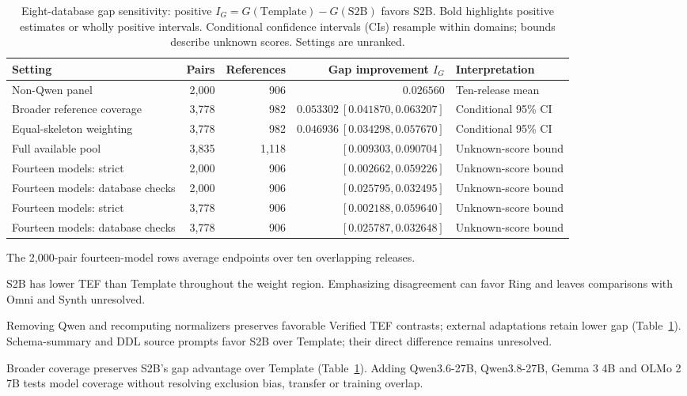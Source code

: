 \begin{table}[t]\centering\small
\caption{Eight-database gap sensitivity: positive $I_G=G(\mathrm{Template})-G(\mathrm{S2B})$ favors S2B. Bold highlights positive estimates or wholly positive intervals. Conditional confidence intervals (CIs) resample within domains; bounds describe unknown scores. Settings are unranked.}
\label{tab:panel-coverage}
\begin{tabular}{lrrrl}\toprule
Setting & Pairs & References & Gap improvement $I_G$ & Interpretation\\\midrule
Non-Qwen panel &2,000&906&$\boldsymbol{0.026560}$&Ten-release mean\\
Broader reference coverage &3,778&982&$\boldsymbol{0.053302\ [0.041870,0.063207]}$&Conditional 95\% CI\\
Equal-skeleton weighting &3,778&982&$\boldsymbol{0.046936\ [0.034298,0.057670]}$&Conditional 95\% CI\\
Full available pool &3,835&1,118&$\boldsymbol{[0.009303,0.090704]}$&Unknown-score bound\\\midrule
Fourteen models: strict &2,000&906&$\boldsymbol{[0.002662,0.059226]}$&Unknown-score bound\\
Fourteen models: database checks &2,000&906&$\boldsymbol{[0.025795,0.032495]}$&Unknown-score bound\\
Fourteen models: strict &3,778&906&$\boldsymbol{[0.002188,0.059640]}$&Unknown-score bound\\
Fourteen models: database checks &3,778&906&$\boldsymbol{[0.025787,0.032648]}$&Unknown-score bound\\\bottomrule
\end{tabular}

\smallskip\parbox{\textwidth}{\footnotesize The 2,000-pair fourteen-model rows average endpoints over ten overlapping releases.}
\end{table}

S2B has lower TEF than Template throughout the weight region. Emphasizing disagreement can favor Ring and leaves comparisons with Omni and Synth unresolved.

Removing Qwen and recomputing normalizers preserves favorable Verified TEF contrasts; external adaptations retain lower gap (Table~\ref{tab:panel-coverage}). Schema-summary and DDL source prompts favor S2B over Template; their direct difference remains unresolved.

Broader coverage preserves S2B's gap advantage over Template (Table~\ref{tab:panel-coverage}). Adding Qwen3.6-27B, Qwen3.8-27B, Gemma 3 4B and OLMo 2 7B tests model coverage without resolving exclusion bias, transfer or training overlap.



